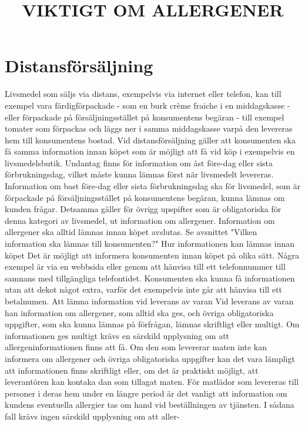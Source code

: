 \section*{Distansförsäljning}
Livsmedel som säljs via distans, exempelvis via internet eller telefon, kan till exempel vara färdigförpackade - som en burk crème fraiche i en middagskasse - eller förpackade på försäljningsstället på konsumentens begäran - till exempel tomater som förpackas och läggs ner i samma middagskasse varpå den levereras hem till konsumentens bostad.
Vid distansförsäljning gäller att konsumenten ska få samma information innan köpet som är möjligt att få vid köp i exempelvis en livsmedelsbutik. Undantag finns för information om åst före-dag eller sista förbrukningsdag, vilket måste kunna lämnas först när livsmedelt levereras. Information om bast före-dag eller sista förbrukningsdag ska för livsmedel, som är förpackade på försäljningsstället på konsumentens begäran, kunna lämnas om kunden frågar. Detsamma gäller för övrigg upspifter som är obligatoriska för denna kategori av livsmedel, ut information om allergener. Information om allergener ska alltid lämnas innan köpet avslutas. Se avsnittet "Vilken information ska lämnas till konsumenten?"
Hur informationen kan lämnas innan köpet
Det är möjligt att informera konsumenten innan köpet på olika sätt. Några exempel är via en webbsida eller genom att hänvisa till ett telefonnummer till samnans med tillgängliga telefontidet. Konsumenten ska kunna få informationen utan att dekot något extra, varför det exempelvis inte går att hänvisa till ett betalnumen.
Att lämna information vid leverans av varan
Vid leverans av varan han information om allergener, som alltid ska ges, och övriga obligatoriska uppgifter, som ska kunna lämnas på förfrågan, lämnas skriftligt eller multigt. Om informationen ges multigt krävs en särskild upplysning om att allergeninformationen finns att få. Om den som levererar maten inte kan informera om allergener och övriga obligatoriska uppgifter kan det vara lämpligt att informationen finns skriftligt eller, om det är praktiskt möjligt, att leverantören kan kontaka dan som tillagat maten. För matlädor som levereras till personer i deras hem under en längre period är det vanligt att information om kundens eventuella allergier tas om hand vid beställningen av tjänsten. I sådana fall krävs ingen särskild upplysning om att aller-

\title{
VIKTIGT OM ALLERGENER
}
